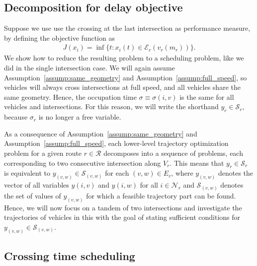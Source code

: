 \documentclass[a4paper]{article}
\theoremstyle{definition}
\theoremstyle{plain}
\begin{document}
\subsection{Decomposition for delay objective}

Suppose we use use the crossing at the last intersection as performance measure, by defining the
objective function as
\begin{align*}
  J(x_{i}) = \inf \{ t: x_{i}(t) \in \mathcal{E}_{r}(v_{r}(m_{r}))\} .
\end{align*}
%
We show how to reduce the resulting problem to a scheduling problem, like we did
in the single intersection case.
%
We will again assume Assumption~\ref{assump:same_geometry} and
Assumption~\ref{assump:full_speed}, so vehicles will always cross intersections
at full speed, and all vehicles share the same geometry. Hence, the occupation
time $\sigma \equiv \sigma(i,v)$ is the same for all vehicles and intersections. For this
reason, we will write the shorthand $y_{r} \in \mathcal{S}_{r}$, because $\sigma_{r}$
is no longer a free variable.

As a consequence of Assumption~\ref{assump:same_geometry} and Assumption~\ref{assump:full_speed},
each lower-level trajectory optimization problem for a given route
$r \in \mathcal{R}$ decomposes into a sequence of problems, each corresponding to
two consecutive intersection along $V_{r}$.
%
This means that $y_{r} \in \mathcal{S}_{r}$ is equivalent to
$y_{(v,w)} \in \mathcal{S}_{(v,w)}$ for each $(v,w) \in E_{r}$, where
$y_{(v,w)}$ denotes the vector of all variables $y(i, v)$ and $y(i, w)$ for all
$i \in \mathcal{N}_{r}$ and $\mathcal{S}_{(v,w)}$ denotes the set of values of $y_{(v,w)}$ for which a feasible trajectory part can be found.
%
Hence, we will now focus on a tandem of two intersections and investigate the
trajectories of vehicles in this with the goal of stating sufficient conditions
for $y_{(v,w)} \in \mathcal{S}_{(v,w)}$.

\subsection{Crossing time scheduling}
\end{document}
